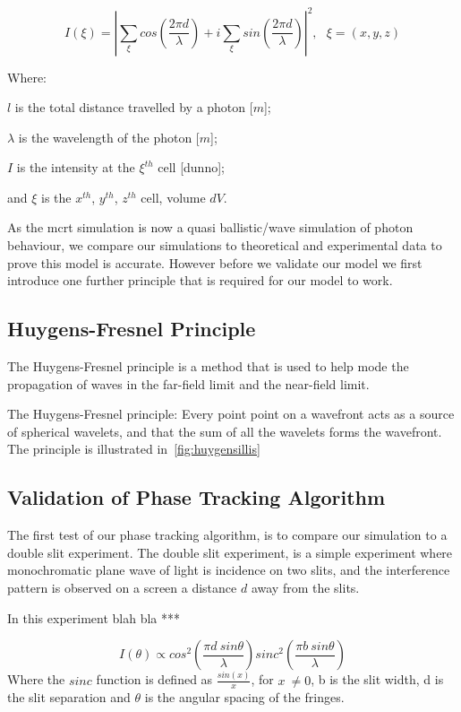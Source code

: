 \begin{equation}
I(\xi)=\left| \sum\limits_{\xi}cos\left(\frac{2\pi d}{\lambda}\right) + i \sum\limits_{\xi}sin\left(\frac{2\pi d}{\lambda}\right)\right|^2,\ \ \ \xi=(x,y,z)
\label{eqn:intense}
\end{equation}

\noindent Where:

\indent $l$ is the total distance travelled by a photon [$m$];

\indent $\lambda$ is the wavelength of the photon [$m$];

\indent $I$ is the intensity at the $\xi^{th}$ cell [dunno];

\indent and $\xi$ is the $x^{th}$, $y^{th}$, $z^{th}$ cell, volume $dV$.

\medskip

As the \gls{mcrt} simulation is now a quasi ballistic/wave simulation of photon behaviour, we compare our simulations to theoretical and experimental data to prove this model is accurate. However before we validate our model we first introduce one further principle that is required for our model to work.

\subsection{Huygens-Fresnel Principle}

The Huygens-Fresnel principle is a method that is used to help mode the propagation of waves in the far-field limit and the near-field limit. 

The Huygens-Fresnel principle: Every point point on a wavefront acts as a source of spherical wavelets, and that the sum of all the wavelets forms the wavefront. The principle is illustrated in~\cref{fig:huygensillis}


\subsection{Validation of Phase Tracking Algorithm}

The first test of our phase tracking algorithm, is to compare our simulation to a double slit experiment.
The double slit experiment, is a simple experiment where monochromatic plane wave of light is incidence on two slits, and the interference pattern is observed on a screen a distance $d$ away from the slits.

In this experiment blah bla ***

\begin{equation}
    I(\theta) \propto cos^2\left(\frac{\pi d\ sin \theta}{\lambda}\right)sinc^2\left(\frac{\pi b\ sin\theta}{\lambda}\right)
\end{equation}
Where the $sinc$ function is defined as $\tfrac{sin(x)}{x}$, for $x\ \neq 0$, b is the slit width, d is the slit separation and $\theta$ is the angular spacing of the fringes.

